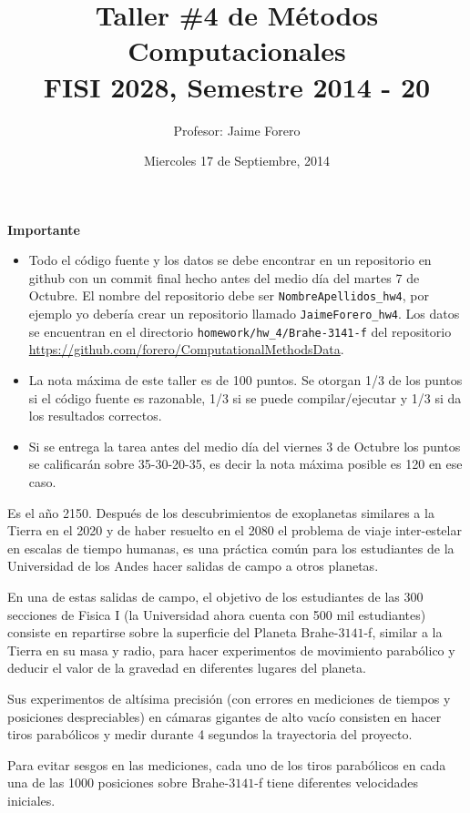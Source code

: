 \documentclass{article}
\title{Taller \#4 de M\'etodos Computacionales\\ FISI 2028, Semestre 2014 - 20}
\author{Profesor: Jaime Forero}
\date{Miercoles 17 de Septiembre, 2014}
\begin{document}
\maketitle
\thispagestyle{empty}


{\bf Importante}
\begin{itemize}

\item Todo el c\'odigo fuente y los datos se debe encontrar en un
  repositorio en github con un commit final hecho antes del medio
  d\'ia del martes 7 de Octubre. El nombre del repositorio debe ser
  \verb"NombreApellidos_hw4", por ejemplo yo deber\'ia crear un
  repositorio llamado \verb"JaimeForero_hw4". Los datos se encuentran en el directorio \verb"homework/hw_4/Brahe-3141-f" del repositorio \url{https://github.com/forero/ComputationalMethodsData}. 

\item 
  La nota m\'axima de este taller es de 100 puntos. Se otorgan 1/3
  de los puntos si el c\'odigo fuente es razonable, 1/3 si se puede
  compilar/ejecutar y 1/3 si da los resultados correctos.  

\item
  Si se entrega la tarea antes del medio d\'ia del viernes 3 de
  Octubre los puntos se calificar\'an sobre 35-30-20-35, es decir la nota
  m\'axima posible es 120 en ese caso.

\end{itemize}


Es el a\~no 2150. Despu\'es de los descubrimientos de exoplanetas
similares a la Tierra en el 2020 y de haber resuelto en el 2080 el
problema de viaje inter-estelar en escalas de tiempo humanas, es una
pr\'actica com\'un para los estudiantes de la Universidad de los Andes
hacer salidas de campo a otros planetas.
 
En una de estas salidas de campo, el objetivo de los estudiantes de
las 300 secciones de Fisica I (la Universidad ahora cuenta con 500 mil
estudiantes) consiste en repartirse sobre la superficie del Planeta
Brahe-$3141$-f, similar a la Tierra en su masa y radio,
para hacer experimentos de movimiento parab\'olico y deducir el valor
de la gravedad en diferentes lugares del planeta.

Sus experimentos de alt\'isima precisi\'on (con errores en mediciones
de tiempos y posiciones despreciables) en c\'amaras gigantes de alto
vac\'io consisten en hacer tiros parab\'olicos y medir durante 4
segundos la trayectoria del proyecto.

Para evitar sesgos en las mediciones, cada uno de los tiros
parab\'olicos en cada una de las 1000 posiciones sobre Brahe-$3141$-f
tiene diferentes velocidades iniciales.
\end{document}
